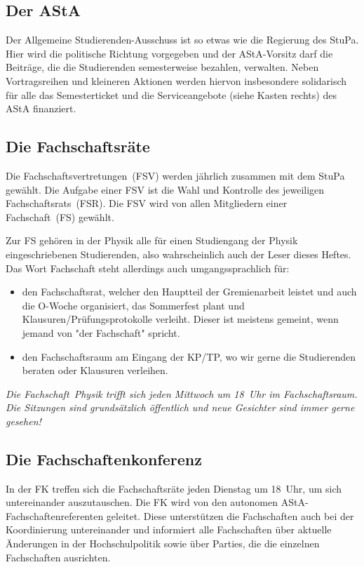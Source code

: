 \begin{multicols*}{2}
\subsection*{Der AStA}
Der Allgemeine Studierenden-Ausschuss ist so etwas wie die Regierung des StuPa. Hier wird die politische Richtung vorgegeben und der AStA-Vorsitz darf die Beiträge, die die Studierenden semesterweise bezahlen, verwalten. Neben Vortragsreihen und kleineren Aktionen werden hiervon insbesondere solidarisch für alle das Semesterticket und die Serviceangebote (siehe Kasten rechts) des AStA finanziert.

\subsection*{Die Fachschaftsräte}
Die Fachschaftsvertretungen~(FSV) werden jährlich zusammen mit dem StuPa gewählt. Die Aufgabe einer FSV ist die Wahl und Kontrolle des jeweiligen Fachschaftsrats~(FSR). Die FSV wird von allen Mitgliedern einer Fachschaft~(FS) gewählt.

Zur FS gehören in der Physik alle für einen Studiengang der Physik eingeschriebenen Studierenden, also wahrscheinlich auch der Leser dieses Heftes. Das Wort Fachschaft steht allerdings auch umgangssprachlich für:
\begin{itemize}
\item den Fachschaftsrat, welcher den Hauptteil der Gremienarbeit leistet und auch die O-Woche organisiert, das Sommerfest plant und Klausuren/Prüfungsprotokolle verleiht. Dieser ist meistens gemeint, wenn jemand von "der Fachschaft" spricht.
\item den Fachschaftsraum am Eingang der KP/TP, wo wir gerne die Studierenden beraten oder Klausuren verleihen.
\end{itemize}
\emph{Die Fachschaft~Physik trifft sich jeden Mittwoch um 18~Uhr im Fachschaftsraum. Die Sitzungen sind grundsätzlich öffentlich und neue Gesichter sind immer gerne gesehen!}

\subsection*{Die Fachschaftenkonferenz}
In der FK treffen sich die Fachschaftsräte jeden Dienstag um 18~Uhr, um sich untereinander auszutauschen. Die FK wird von den autonomen AStA-Fachschaftenreferenten geleitet. Diese unterstützen die Fachschaften auch bei der Koordinierung untereinander und informiert alle Fachschaften über aktuelle Änderungen in der Hochschulpolitik sowie über Parties, die die einzelnen Fachschaften ausrichten.

\end{multicols*}
\clearpage


